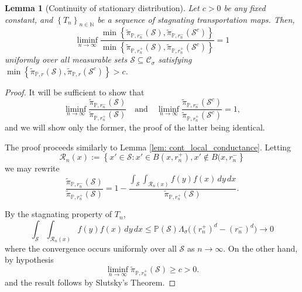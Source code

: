 \documentclass{article}
\newcommand{\set}[1]{\left\{#1\right\}}
\newcommand{\seq}[1]{\left\{#1\right\}_{n \in \mathbb{N}}}
\newcommand{\1}{\mathbf{1}}
\newcommand{\Pbb}{\mathbb{P}}
\newcommand{\Sset}{\mathcal{S}}
\newcommand{\Cset}{\mathcal{C}}
\newcommand{\Csig}{\Cset_{\sigma}}
\newcommand{\dx}{\,dx}
\newcommand{\dy}{\,dy}
\newcommand{\piwt}{\widetilde{\pi}}
\theoremstyle{aldenthm}
\newtheorem{lemma}{Lemma}
\theoremstyle{aldenrmrk}
\begin{document}
\begin{lemma}[Continuity of stationary distribution]
	\label{lem: cont_stationary_dist}
	Let $c > 0$ be any fixed constant, and $\seq{T_n}$ be a sequence of stagnating transportation maps. Then,
	\begin{equation*}
	\liminf_{n \to \infty} \frac{\min \set{\piwt_{\Pbb,r_n^-}(\Sset), \piwt_{\Pbb,r_n^-}(\Sset^c)} }{\min \set{\piwt_{\Pbb,r_n^+}(\Sset), \piwt_{\Pbb,r_n^+}(\Sset^c)} } = 1
	\end{equation*}
	uniformly over all measurable sets $\Sset \subseteq \Csig$ satisfying $\min \set{\piwt_{\Pbb,r}(\Sset), \piwt_{\Pbb,r}(\Sset^c)}> c$. 
\end{lemma}
\begin{proof}
	It will be sufficient to show that
	\begin{equation*}
	\liminf_{n \to \infty} \frac{\piwt_{\Pbb,r_n^-}(\Sset)}{\piwt_{\Pbb,r_n^+}(\Sset)} \quad \text{and}  \quad \liminf_{n \to \infty} \frac{\piwt_{\Pbb,r_n^-}(\Sset^c)}{\piwt_{\Pbb,r_n^+}(\Sset^c)} = 1,
	\end{equation*}
	and we will show only the former, the proof of the latter being identical.
	
	The proof proceeds similarly to Lemma \ref{lem: cont_local_conductance}. Letting 
	\begin{equation*}
	\mathcal{R}_n(x) := \set{x' \in \Sset: x' \in B(x,r_n^+), x' \not\in B(x,r_n^-}
	\end{equation*}
	we may rewrite
	\begin{equation*}
	\frac{\piwt_{\Pbb,r_n^-}(\Sset)}{\piwt_{\Pbb,r_n^+}(\Sset)} = 1 - \frac{\int_{\Sset} \int_{\mathcal{R}_n(x)} f(y) f(x) \dy \dx}{\piwt_{\Pbb,r_n^+}(\Sset)}.
	\end{equation*}
	
	By the stagnating property of $T_n$,
	\begin{equation*}
	\int_{\Sset} \int_{\mathcal{R}_n(x)} f(y) f(x) \dy \dx \leq \Pbb(\Sset) \Lambda_{\sigma} \bigl( (r_n^+)^d - (r_n^-)^d\bigr) \to 0 
	\end{equation*}
	where the convergence occurs uniformly over all $\Sset$ as $n \to \infty$. On the other hand, by hypothesis
	\begin{equation*}
	\liminf_{n \to \infty} \piwt_{\Pbb,r_n^+}(\Sset) \geq c > 0.
	\end{equation*}
	and the result follows by Slutsky's Theorem. 
\end{proof}
\end{document}
